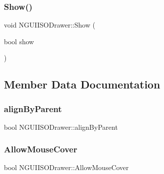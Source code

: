 \hypertarget{class_n_g_u_i_i_s_o_drawer_a2f9c5b7ff0d93b2d90d73b1bd4620ce9}{}\label{class_n_g_u_i_i_s_o_drawer_a2f9c5b7ff0d93b2d90d73b1bd4620ce9} 
\subsubsection{\texorpdfstring{Show()}{Show()}}
{\footnotesize\ttfamily void N\+G\+U\+I\+I\+S\+O\+Drawer\+::\+Show (\begin{DoxyParamCaption}\item[{bool}]{show }\end{DoxyParamCaption})}



\subsection{Member Data Documentation}
\hypertarget{class_n_g_u_i_i_s_o_drawer_aef94524b5438004239f9883ffccf0d75}{}\label{class_n_g_u_i_i_s_o_drawer_aef94524b5438004239f9883ffccf0d75} 
\subsubsection{\texorpdfstring{align\+By\+Parent}{alignByParent}}
{\footnotesize\ttfamily bool N\+G\+U\+I\+I\+S\+O\+Drawer\+::align\+By\+Parent}

\hypertarget{class_n_g_u_i_i_s_o_drawer_a09f6e97a93d97cbc0d0e3b3e1a501818}{}\label{class_n_g_u_i_i_s_o_drawer_a09f6e97a93d97cbc0d0e3b3e1a501818} 
\subsubsection{\texorpdfstring{Allow\+Mouse\+Cover}{AllowMouseCover}}
{\footnotesize\ttfamily bool N\+G\+U\+I\+I\+S\+O\+Drawer\+::\+Allow\+Mouse\+Cover}

\hypertarget{class_n_g_u_i_i_s_o_drawer_a22c00ab387a06414a0507bde1eedeaf0}{}\label{class_n_g_u_i_i_s_o_drawer_a22c00ab387a06414a0507bde1eedeaf0} 
